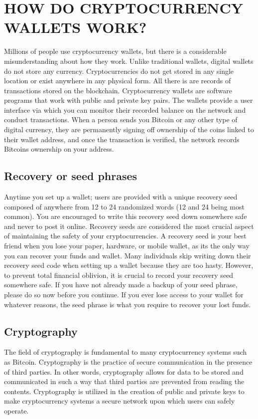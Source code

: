 \chapter{HOW DO CRYPTOCURRENCY WALLETS WORK?}
\label{ch:technical wallets}

Millions of people use cryptocurrency wallets, but there is a considerable misunderstanding about how they work. Unlike traditional  wallets, digital wallets do not store any currency. Cryptocurrencies do not get stored in any single location or exist anywhere in any physical form. All there is are records of transactions stored on the blockchain. Cryptocurrency wallets are software programs that work with public and private key pairs. The wallets provide a user interface via which you can monitor their recorded balance on the network and conduct transactions. When a person sends you Bitcoin or any other type of digital currency, they are permanently signing off ownership of the coins linked to their wallet address, and once the transaction is verified, the network records Bitcoins ownership on your address.

\section{Recovery or seed phrases}
Anytime you set up a wallet; users are provided with a unique recovery seed composed of anywhere from 12 to 24 randomized words (12 and 24 being most common). You are encouraged to write this recovery seed down somewhere safe and never to post it online.
Recovery seeds are considered the most crucial aspect of maintaining the safety of your cryptocurrencies. A recovery seed is your best friend when you lose your paper, hardware, or mobile wallet, as its the only way you can recover your funds and wallet. Many individuals skip writing down their recovery seed code when setting up a wallet because they are too hasty. However, to prevent total financial oblivion, it is crucial to record your recovery seed somewhere safe. If you have not already made a backup of your seed phrase, please do so now before you continue. If you ever lose access to your wallet for whatever reasons, the seed phrase is what you require to recover your lost funds. 


\section{Cryptography}
The field of cryptography is fundamental to many cryptocurrency systems such as Bitcoin. Cryptography is the practice of secure communication in the presence of third parties. In other words, cryptography allows for data to be stored and communicated in such a way that third parties are prevented from reading the contents. Cryptography is utilized in the creation of public and private keys to make cryptocurrency systems a secure network upon which users can safely operate.\medskip

